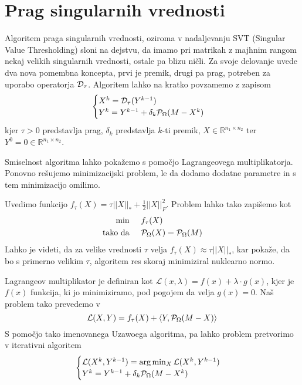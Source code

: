\section{Prag singularnih vrednosti}

Algoritem praga singularnih vrednosti, oziroma v nadaljevanju SVT (Singular Value Thresholding) sloni na dejstvu, da imamo pri matrikah z majhnim rangom nekaj velikih singularnih vrednosti, ostale pa blizu ničli. Za svoje delovanje uvede dva nova pomembna koncepta, prvi je premik, drugi pa prag, potreben za uporabo operatorja $\mathcal{D}_\tau$. Algoritem lahko na kratko povzamemo z zapisom
\[
    \begin{cases}
        X^k = \mathcal{D}_\tau(Y^{k-1}) \\
        Y^k = Y^{k-1} + \delta_k \mathcal{P}_\Omega(M - X^k) 
    \end{cases}
\]
kjer $\tau > 0$ predstavlja prag, $\delta_k$ predstavlja $k$-ti premik, $X \in \mathbb{R}^{n_1 \times n_2}$ ter
$Y^0 = 0 \in \mathbb{R}^{n_1 \times n_2}$. \cite{CCS}

Smiselnost algoritma lahko pokažemo s pomočjo Lagrangeovega multiplikatorja. Ponovno rešujemo minimizacijski problem, le da dodamo dodatne parametre in s tem minimizacijo omilimo. 

Uvedimo funkcijo $f_\tau(X) = \tau||X||_* + \frac{1}{2}||X||^2_F$. Problem lahko tako zapišemo kot 
\begin{align*}
    \textrm{min} & \hspace{0.5cm} f_\tau(X) \\
    \textrm{tako da} & \hspace{0.5cm} \mathcal{P}_\Omega(X) = \mathcal{P}_\Omega(M)
\end{align*}
Lahko je videti, da za velike vrednosti $\tau$ velja $f_\tau(X) \approx \tau||X||_*$, kar pokaže, da bo s primerno velikim $\tau$, algoritem res skoraj minimiziral nuklearno normo.

Lagrangeov multiplikator je definiran kot $\mathcal{L}(x, \lambda) = f(x) + \lambda \cdot g(x)$, kjer je $f(x)$ funkcija, ki jo minimiziramo, pod pogojem da velja $g(x) = 0$. Naš problem tako prevedemo v
\[
    \mathcal{L}(X, Y) = f_\tau(X) + \left< Y, \mathcal{P}_\Omega(M - X) \right>
\] 
S pomočjo tako imenovanega Uzawoega algoritma, pa lahko problem pretvorimo v iterativni algoritem 
\[
    \begin{cases}
        \mathcal{L}(X^k, Y^{k-1}) =  \arg \min_{X} \mathcal{L}(X^k, Y^{k-1}) \\
        Y^k = Y^{k-1} + \delta_k \mathcal{P}_\Omega(M - X^k) 
    \end{cases}
\] \cite{CCS}

